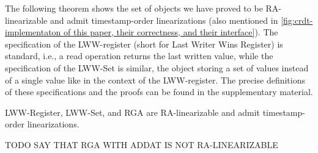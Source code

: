 The following theorem shows the set of objects we have proved to be RA-linearizable and admit timestamp-order linearizations (also mentioned in \autoref{fig:crdt-implementaton of this paper, their correctness, and their interface}). The specification of the LWW-register (short for Last Writer Wins Register) is standard, i.e., a read operation returns the last written value, while the specification of the LWW-Set is similar, the object storing a set of values instead of a single value like in the context of the LWW-register. The precise definitions of these specifications and the proofs can be found in the supplementary material.

\begin{theorem}\label{th:ts_order_objects}
LWW-Register, LWW-Set, and RGA are RA-linearizable and admit timestamp-order linearizations.
\end{theorem}

TODO SAY THAT RGA WITH ADDAT IS NOT RA-LINEARIZABLE

